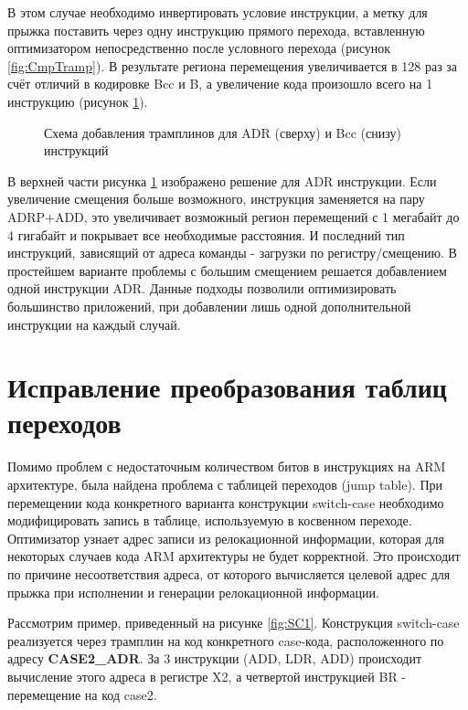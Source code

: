 В этом случае необходимо инвертировать условие инструкции, а метку для прыжка поставить через одну инструкцию прямого перехода, вставленную оптимизатором непосредственно после условного перехода (рисунок \cref{fig:CmpTramp}). В результате региона перемещения увеличивается в 128 раз за счёт отличий в кодировке Bcc и B, а увеличение кода произошло всего на 1 инструкцию (рисунок \cref{fig:ExTramp}).
 
\begin{figure}[ht]
    \caption{Схема добавления трамплинов для ADR (сверху) и Bcc (снизу) инструкций}\label{fig:ExTramp}
\end{figure}

В верхней части рисунка \cref{fig:ExTramp} изображено решение для ADR инструкции. Если увеличение смещения больше возможного, инструкция заменяется на пару ADRP+ADD, это увеличивает возможный регион перемещений с 1 мегабайт до 4 гигабайт и покрывает все необходимые расстояния.
И последний тип инструкций, зависящий от адреса команды - загрузки по регистру/смещению. В простейшем варианте проблемы с большим смещением решается добавлением одной инструкции ADR.
Данные подходы позволили оптимизировать большинство приложений, при добавлении лишь одной дополнительной инструкции на каждый случай.

\section{Исправление преобразования таблиц переходов}\label{sec:ch3/sect2}

Помимо проблем с недостаточным количеством битов в инструкциях на ARM архитектуре, была найдена проблема с таблицей переходов (jump table). При перемещении кода конкретного варианта конструкции switch-case необходимо модифицировать запись в таблице, используемую в косвенном переходе. Оптимизатор узнает адрес записи из релокационной информации, которая для некоторых случаев кода ARM архитектуры не будет корректной. Это происходит по причине несоответствия адреса, от которого вычисляется целевой адрес для прыжка при исполнении и генерации релокационной информации.

Рассмотрим пример, приведенный на рисунке \cref{fig:SC1}. Конструкция switch-case реализуется через трамплин на код конкретного case-кода, расположенного по адресу \textbf{CASE2\_ADR}. За 3 инструкции (ADD, LDR, ADD) происходит вычисление этого адреса в регистре X2, а четвертой инструкцией BR - перемещение на код case2.


